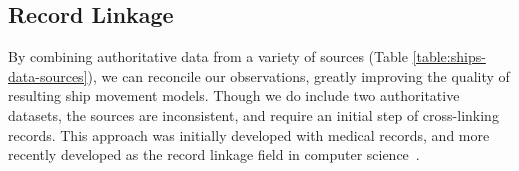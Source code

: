 

\subsection{Record Linkage}

By combining authoritative data from a variety of sources (Table \ref{table:ships-data-sources}), we can reconcile our observations, greatly improving the quality of resulting ship movement models. Though we do include two authoritative datasets, the sources are inconsistent, and require an initial step of cross-linking records. This approach was initially developed with medical records, and more recently developed as the record linkage field in computer science~\citep{Christen2012}.

